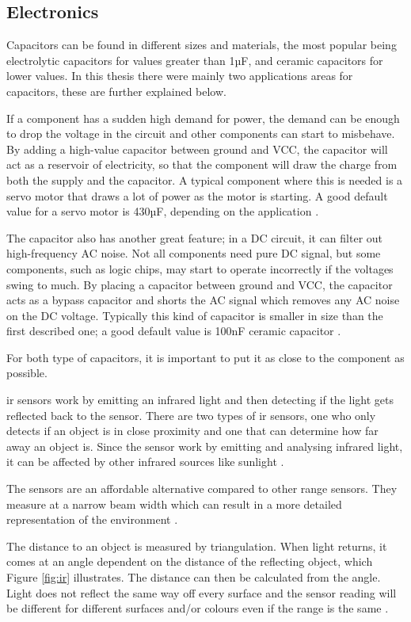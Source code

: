 \subsection{Electronics}
\label{sec:capacitor}
Capacitors can be found in different sizes and materials, the most popular being electrolytic capacitors for values greater than 1µF, and ceramic capacitors for lower values. In this thesis there were mainly two applications areas for capacitors, these are further explained below.

If a component has a sudden high demand for power, the demand can be enough to drop the voltage in the circuit and other components can start to misbehave. By adding a high-value capacitor between ground and VCC, the capacitor will act as a reservoir of electricity, so that the component will draw the charge from both the supply and the capacitor. A typical component where this is needed is a servo motor that draws a lot of power as the motor is starting. A good default value for a servo motor is 430µF, depending on the application \cite{highcapacitor}.

The capacitor also has another great feature; in a DC circuit, it can filter out high-frequency AC noise. Not all components need pure DC signal, but some components, such as logic chips, may start to operate incorrectly if the voltages swing to much. By placing a capacitor between ground and VCC, the capacitor acts as a bypass capacitor and shorts the AC signal which removes any AC noise on the DC voltage. Typically this kind of capacitor is smaller in size than the first described one; a good default value is 100nF ceramic capacitor \cite{lowcapacitor}.

For both type of capacitors, it is important to put it as close to the component as possible.

\acrfull{ir} sensors work by emitting an infrared light and then detecting if the light gets reflected back to the sensor. There are two types of \acrshort{ir} sensors, one who only detects if an object is in close proximity and one that can determine how far away an object is. Since the sensor work by emitting and analysing infrared light, it can be affected by other infrared sources like sunlight \cite{infrared}. 

The sensors are an affordable alternative compared to other range sensors. They measure at a narrow beam width which can result in a more detailed representation of the environment \cite{infrared}.

The distance to an object is measured by triangulation. When light returns, it comes at an angle dependent on the distance of the reflecting object, which Figure \ref{fig:ir} illustrates. The distance can then be calculated from the angle. Light does not reflect the same way off every surface and the sensor reading will be different for different surfaces and/or colours even if the range is the same \cite{infrared}.

\newpage